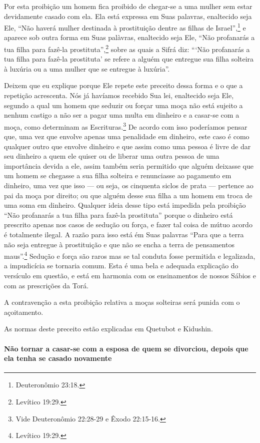 Por esta proibição um homem fica proibido de chegar-se a uma mulher sem
estar devidamente casado com ela. Ela está expressa em Suas palavras,
enaltecido seja Ele, ``Não haverá mulher destinada à prostituição dentre
as filhas de Israel'',\footnote{Deuteronômio 23:18.} e aparece sob outra forma
em Suas palàvras, enaltecido seja Ele, ``Não profanarás a tua filha
para fazê-la prostituta'',\footnote{Levítico 19:29.} sobre as quais a Sifrá diz:
```Não profanarás a tua filha para fazê-la prostituta' se refere a
alguém que entregue sua filha solteira à luxúria ou a uma mulher que se
entregue à luxúria''.

Deixem que eu explique porque Ele repete este preceito dessa forma e o
que a repetição acrescenta. Nós já havíamos recebido Sua lei, enaltecido
seja Ele, segundo a qual um homem que seduzir ou forçar uma moça não
está sujeito a nenhum castigo a não ser a pagar uma multa em dinheiro e
a casar-se com a moça, como determinam as
Escrituras.\footnote{Vide Deuteronômio 22:28-29 e Êxodo 22:15-16.} De acordo com isso poderíamos pensar
que, uma vez que envolve apenas uma penalidade em dinheiro, este caso é
como qualquer outro que envolve dinheiro e que assim como uma pessoa é
livre de dar seu dinheiro a quem ele quiser ou de liberar uma outra
pessoa de uma importância devida a ele, assim também seria permitido que
alguém deixasse que um homem se chegasse a sua filha solteira e
renunciasse ao pagamento em dinheiro, uma vez que isso --- ou seja, os
cinquenta siclos de prata --- pertence ao pai da moça por direito; ou
que alguém desse sua filha a um homem em troca de uma soma em dinheiro.
Qualquer ideia desse tipo está impedida pela proibição ``Não profanarás
a tua filha para fazê-la prostituta'' porque o dinheiro está prescrito
apenas nos casos de sedução ou força, e fazer tal coisa de mútuo acordo
é totalmente ilegal. A razão para isso está ém Suas palavras ``Para que
a terra não seja entregue à prostituição e que não se encha a terra de
pensamentos maus''.\footnote{Levítico 19:29.} Sedução e força são raros mas se
tal conduta fosse permitida e legalizada, a impudicícia se tornaria
comum. Esta é uma bela e adequada explicação do versículo em questão, e
está em harmonia com os ensinamentos de nossos Sábios e com as
prescrições da Torá.

A contravenção a esta proibição relativa a moças solteiras será punida
com o açoitamento.

As normas deste preceito estão explicadas em Quetubot e Kidushin.

\paragraph{Não tornar a casar-se com a esposa de quem se divorciou, depois que
ela tenha se casado novamente}

